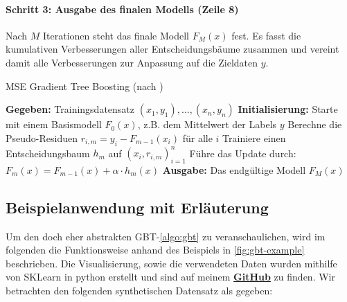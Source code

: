 \paragraph{Schritt 3: Ausgabe des finalen Modells (Zeile 8)}
Nach \( M \) Iterationen steht das finale Modell \( F_M(x) \) fest. Es fasst die kumulativen Verbesserungen aller Entscheidungsbäume zusammen und vereint damit alle Verbesserungen zur Anpassung auf die Zieldaten \(y\).

\begin{algorithm}[H]
    \caption[MSE Gradient Tree Boosting]{MSE Gradient Tree Boosting (nach \textcite[S.~346]{Frochte2020})}\label{algo:gbt}
    \begin{algorithmic}[1]
    \State \textbf{Gegeben:} Trainingsdatensatz \( (x_1,y_1), \dots, (x_n,y_n) \)
    \State \textbf{Initialisierung:} Starte mit einem Basismodell \( F_0(x) \), z.B. dem Mittelwert der Labels \( y \)
        \State Berechne die Pseudo-Residuen \( r_{i,m} = y_i - F_{m-1}(x_i) \) für alle \( i \)
        \State Trainiere einen Entscheidungsbaum \( h_m \) auf \( (x_i, r_{i,m})_{i=1}^n \)
        \State Führe das Update durch: \( F_m(x) = F_{m-1}(x) + \alpha \cdot h_m(x) \)
    \EndFor
    \State \textbf{Ausgabe:} Das endgültige Modell \( F_M(x) \)
    \end{algorithmic}
\end{algorithm}

\subsection{Beispielanwendung mit Erläuterung}
Um den doch eher abstrakten GBT-\autoref{algo:gbt} zu veranschaulichen, wird im folgenden die Funktionsweise anhand des Beispiels in \autoref{fig:gbt-example} beschrieben.
\newline
Die Visualisierung, sowie die verwendeten Daten wurden mithilfe von SKLearn in python erstellt und sind auf meinem \textbf{\href{https://github.com/CodeLtDave/Boosting-Algorithms-ML-Seminararbeit/blob/main/python-env/GBT-Example.ipynb}{GitHub}}
 zu finden. Wir betrachten den folgenden synthetischen Datensatz als gegeben:

